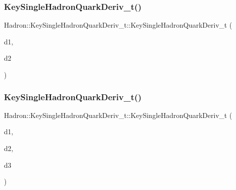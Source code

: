 \subsubsection{\texorpdfstring{KeySingleHadronQuarkDeriv\_t()}{KeySingleHadronQuarkDeriv\_t()}\hspace{0.1cm}{\footnotesize\ttfamily [8/15]}}
{\footnotesize\ttfamily Hadron\+::\+Key\+Single\+Hadron\+Quark\+Deriv\+\_\+t\+::\+Key\+Single\+Hadron\+Quark\+Deriv\+\_\+t (\begin{DoxyParamCaption}\item[{const \mbox{\hyperlink{structHadron_1_1SingleHadronQuarkDeriv__t}{Single\+Hadron\+Quark\+Deriv\+\_\+t}} \&}]{d1,  }\item[{const \mbox{\hyperlink{structHadron_1_1SingleHadronQuarkDeriv__t}{Single\+Hadron\+Quark\+Deriv\+\_\+t}} \&}]{d2 }\end{DoxyParamCaption})\hspace{0.3cm}{\ttfamily [inline]}}

\mbox{\label{structHadron_1_1KeySingleHadronQuarkDeriv__t_a228d03db64fbe8db5371d92e4fb3806e}} 
\subsubsection{\texorpdfstring{KeySingleHadronQuarkDeriv\_t()}{KeySingleHadronQuarkDeriv\_t()}\hspace{0.1cm}{\footnotesize\ttfamily [9/15]}}
{\footnotesize\ttfamily Hadron\+::\+Key\+Single\+Hadron\+Quark\+Deriv\+\_\+t\+::\+Key\+Single\+Hadron\+Quark\+Deriv\+\_\+t (\begin{DoxyParamCaption}\item[{const \mbox{\hyperlink{structHadron_1_1SingleHadronQuarkDeriv__t}{Single\+Hadron\+Quark\+Deriv\+\_\+t}} \&}]{d1,  }\item[{const \mbox{\hyperlink{structHadron_1_1SingleHadronQuarkDeriv__t}{Single\+Hadron\+Quark\+Deriv\+\_\+t}} \&}]{d2,  }\item[{const \mbox{\hyperlink{structHadron_1_1SingleHadronQuarkDeriv__t}{Single\+Hadron\+Quark\+Deriv\+\_\+t}} \&}]{d3 }\end{DoxyParamCaption})\hspace{0.3cm}{\ttfamily [inline]}}

